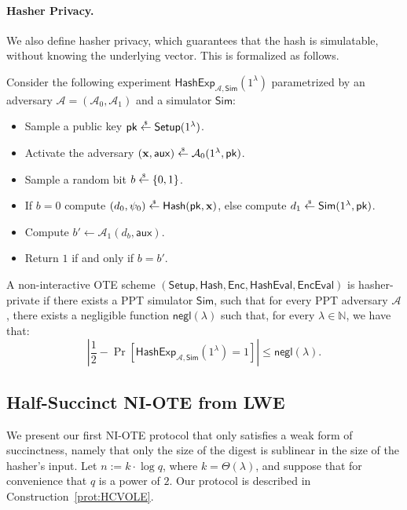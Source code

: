 \documentclass{article}
\newcommand{\getsr}{\overset{\raisebox{-1pt}{$\scriptscriptstyle \$$}}{\gets}}
\newcommand{\sample}{\getsr}
\newcommand{\N}{\mathbb{N}}
\newcommand{\negl}{\mathsf{negl}}
\renewcommand{\sec}{\ensuremath{\lambda}}
\newcommand{\aux}{\mathsf{aux}}
\newcommand{\Sim}{\mathsf{Sim}}
\newcommand{\Adv}{\mathcal{A}}
\newcommand{\algofont}[1]{\ensuremath{\mathsf{#1}}}
\newcommand{\Enc}{{\algofont{Enc}}}
\newcommand{\Setup}{{\algofont{Setup}}}
\newcommand{\Eval}{\algofont{Eval}\xspace}
\newcommand{\Hash}{{\algofont{Hash}}}
\newcommand{\pk}{{\mathsf{pk}}}
\newcommand\bbbone{1}
\begin{document}
{
\paragraph{Hasher Privacy.} We also define hasher privacy, which guarantees that the hash is simulatable, without knowing the underlying vector. This is formalized as follows.}
{
\begin{definition}
Consider the following experiment $\mathsf{HashExp}_{\mathcal{A}, \Sim}(\bbbone^\sec)$ parametrized by an adversary $\mathcal{A} = (\mathcal{A}_0, \allowbreak \mathcal{A}_1)$ and a simulator $\Sim$:
\begin{itemize}
    \item Sample a public key $\pk\sample\Setup(\bbbone^\sec)$.
    \item Activate the adversary $(\mathbf{x}, \aux)\sample\Adv_0(\bbbone^\sec, \pk)$.
    \item Sample a random bit $b\sample\{0, 1\}$. 
    \item If $b = 0$ compute $(d_0, \psi_0)\sample\Hash(\pk, \mathbf{x})$, else compute 
    $d_1\sample\Sim(\bbbone^\sec, \pk)$.
    \item Compute $b' \gets \Adv_1(d_b, \aux)$.
    \item Return $1$ if and only if $b =b'$.
\end{itemize}
A non-interactive OTE scheme $(\Setup, \allowbreak \Hash, \allowbreak \Enc, \allowbreak \Hash\Eval, \allowbreak \Enc\Eval)$ is hasher-private if there exists a PPT simulator $\Sim$, such that for every PPT adversary $\mathcal{A}$, there exists a negligible function $\negl(\sec)$ such that, for every $\sec\in\N$, we have that:
\[
\left|\frac{1}{2} - \Pr\left[\mathsf{HashExp}_{\mathcal{A}, \Sim}(\bbbone^\sec) = 1\right] \right|\le\negl(\sec).
\]
\end{definition}}

\subsection{Half-Succinct NI-OTE from LWE}\label{sec:halfNIOTE}

We present our first NI-OTE protocol that only satisfies a weak form of succinctness, namely that only the size of the digest is sublinear in the size of the hasher's input. Let $n:= k\cdot \log q$, where $k=\Theta(\sec)$, and suppose that for convenience that $q$ is a power of $2$. Our protocol is described in Construction~\ref{prot:HCVOLE}.
\end{document}
